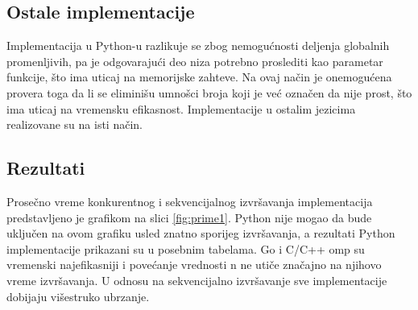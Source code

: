 \documentclass[12pt,oneside]{memoir}
\begin{document}
\subsection{Ostale implementacije}
Implementacija u Python-u razlikuje se zbog nemogućnosti deljenja globalnih promenljivih, pa je odgovarajući deo niza potrebno proslediti kao parametar funkcije, što ima uticaj na memorijske zahteve. Na ovaj način je onemogućena provera toga da li se eliminišu umnošci broja koji je već označen da nije prost, što ima uticaj na vremensku efikasnost. Implementacije u ostalim jezicima realizovane su na isti način.

\subsection{Rezultati}

Prosečno vreme konkurentnog i sekvencijalnog izvršavanja implementacija predstavljeno je grafikom na slici \ref{fig:prime1}. Python nije mogao da bude uključen na ovom grafiku usled znatno sporijeg izvršavanja, a rezultati Python implementacije prikazani su u posebnim tabelama. Go i C/C++ omp su vremenski najefikasniji i povećanje vrednosti n ne utiče značajno na njihovo vreme izvršavanja. U odnosu na sekvencijalno izvršavanje sve implementacije dobijaju višestruko ubrzanje. 

\end{document}
